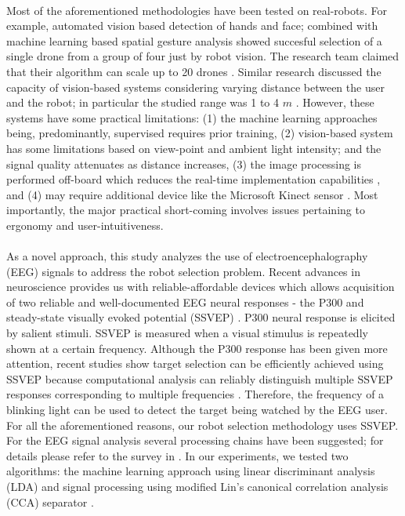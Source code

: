 \documentclass{svmult}
\begin{document}
\\
Most of the aforementioned methodologies have been tested on real-robots. For example, automated vision based detection of hands and face; combined with machine learning based spatial gesture analysis showed succesful selection of a single drone from a group of four just by robot vision. 
The research team claimed that their algorithm can scale up to 20 drones \cite{Nagietal2014}. Similar research discussed the capacity of vision-based systems considering varying distance between the user and the robot; in particular the studied range was 1 to 4 $m$ \cite{Couture-Beil2010}. 
However, these systems have some practical limitations: (1) the machine learning approaches being, predominantly, supervised requires prior training, (2) vision-based system has some limitations based on view-point and ambient light intensity; and the signal quality attenuates as distance increases, (3) the image processing is performed off-board which reduces the real-time implementation capabilities \cite{Monajjemi2013, Pourmehr2013}, and (4) may require additional device like the Microsoft Kinect sensor \cite{ alonso2015gesture, pourmehr2013robust}. 
Most importantly, the major practical short-coming involves issues pertaining to ergonomy and user-intuitiveness.\\
\\ 
As a novel approach, this study analyzes the use of electroencephalography (EEG) signals to address the robot selection problem. Recent advances in neuroscience provides us with reliable-affordable devices which allows acquisition of two reliable and well-documented EEG neural responses - the P300 and steady-state visually evoked potential (SSVEP) \cite{Zhu2010, Bi2013, Beverina2003}. 
P300 neural response is elicited by salient stimuli. SSVEP is measured when a visual stimulus is repeatedly shown at a certain frequency. Although the P300 response has been given more attention, recent studies show target selection can be efficiently achieved using SSVEP because computational analysis can reliably distinguish multiple SSVEP responses corresponding to multiple frequencies \cite{SSVEPfiability}. Therefore, the frequency of a blinking light can be used to detect the target being watched by the EEG user. 
For all the aforementioned reasons, our robot selection methodology uses SSVEP. For the EEG signal analysis several processing chains have been suggested; for details please refer to the survey in \cite{Bi2013}. In our experiments, we tested two algorithms: the machine learning approach using linear discriminant analysis (LDA) \cite{openvibeSSVEP} and signal processing using modified Lin's canonical correlation analysis (CCA) separator \cite{Lin2014}. 
\end{document}

